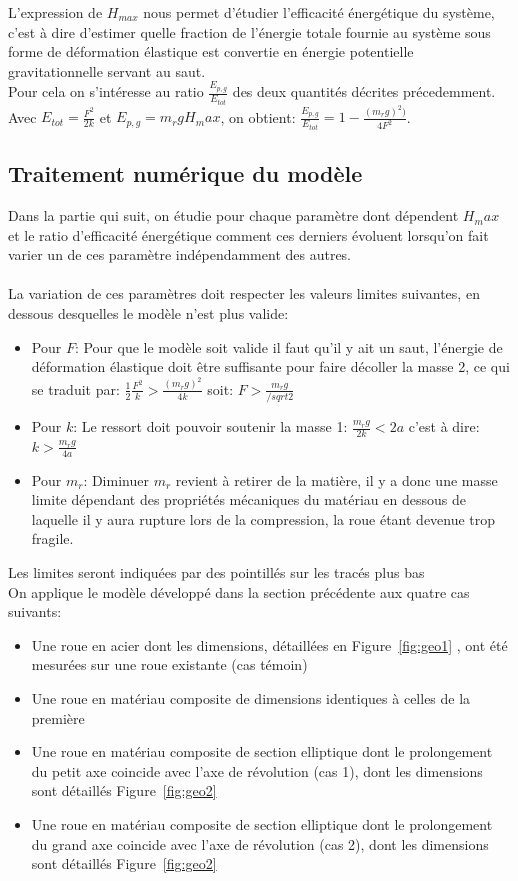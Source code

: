 L'expression de $H_{max}$ nous permet d'étudier l'efficacité énergétique du système, c'est à dire d'estimer quelle fraction de l'énergie totale fournie au système sous forme de déformation élastique est convertie en énergie potentielle gravitationnelle servant au saut. \\
Pour cela on s'intéresse au ratio $\frac{E_{p,g}}{E_{tot}}$ des deux quantités décrites précedemment. \\
Avec $E_{tot}=\frac{F^2}{2k}$ et $E_{p,g}=m_r g H_max$, on obtient:  $\frac{E_{p,g}}{E_{tot}}=1-\frac{(m_r g)^2)}{4F^2}$.

\subsection{Traitement numérique du modèle}
Dans la partie qui suit, on étudie pour chaque paramètre dont dépendent $H_max$ et le ratio d'efficacité énergétique comment ces derniers évoluent lorsqu'on fait varier un de ces paramètre indépendamment des autres.
\\ 
\\ 
La variation de ces paramètres doit respecter les valeurs limites suivantes, en dessous desquelles le modèle n'est plus valide:
\begin{itemize}
    \item Pour $F$: Pour que le modèle soit valide il faut qu’il y ait un saut, l'énergie de déformation élastique doit être suffisante pour faire décoller la masse 2, ce qui se traduit par: $\frac{1}{2} \frac{F^2}{k}>\frac{(m_r g)^2}{4k}$  soit: $F>\frac{m_r g}{/sqrt{2}}$
    \item Pour $k$: Le ressort doit pouvoir soutenir la masse 1: $\frac{m_r g}{2k}<2a$ c'est à dire: $k>\frac{m_r g}{4a}$ 
    \item Pour $m_r$: Diminuer $m_r$ revient à retirer de la matière, il y a donc une masse limite dépendant des propriétés mécaniques du matériau en dessous de laquelle il y aura rupture lors de la compression, la roue étant devenue trop fragile.
\end{itemize}
Les limites seront indiquées par des pointillés sur les tracés plus bas
\\
On applique le modèle développé dans la section précédente aux quatre cas suivants:
\begin{itemize}
	\item Une roue en acier dont les dimensions, détaillées en Figure~\ref{fig:geo1} ,  ont été mesurées sur une roue existante (cas témoin)
	\item Une roue en matériau composite de dimensions identiques à celles de la première
	\item Une roue en matériau composite de section elliptique dont le prolongement du petit axe coincide avec l'axe de révolution (cas 1), dont les dimensions sont détaillés Figure~\ref{fig:geo2}
	\item Une roue en matériau composite de section elliptique dont le prolongement du grand axe coincide avec l'axe de révolution (cas 2), dont les dimensions sont détaillés Figure~\ref{fig:geo2}
\end{itemize}

